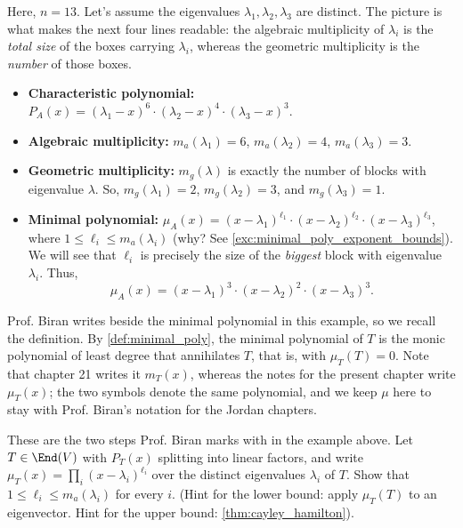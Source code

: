 \begin{example}
Here, $n = 13$. Let's assume the eigenvalues $\lambda_1, \lambda_2, \lambda_3$ are distinct. The picture is what makes the next four lines readable: the algebraic multiplicity of $\lambda_i$ is the \emph{total size} of the boxes carrying $\lambda_i$, whereas the geometric multiplicity is the \emph{number} of those boxes.
\begin{itemize}
    \item \textbf{Characteristic polynomial:} $P_A(x) = (\lambda_1 - x)^6 \cdot (\lambda_2 - x)^4 \cdot (\lambda_3 - x)^3$.
    \item \textbf{Algebraic multiplicity:} $m_a(\lambda_1) = 6$, $m_a(\lambda_2) = 4$, $m_a(\lambda_3) = 3$.
    \item \textbf{Geometric multiplicity:} $m_g(\lambda)$ is exactly the number of blocks with eigenvalue $\lambda$. So, $m_g(\lambda_1) = 2$, $m_g(\lambda_2) = 3$, and $m_g(\lambda_3) = 1$.
    \item \textbf{Minimal polynomial:} $\mu_A(x) = (x - \lambda_1)^{\ell_1} \cdot (x - \lambda_2)^{\ell_2} \cdot (x - \lambda_3)^{\ell_3}$, where $1 \le \ell_i \le m_a(\lambda_i)$ (why? See \cref{exc:minimal_poly_exponent_bounds}). We will see that $\ell_i$ is precisely the size of the \emph{biggest} block with eigenvalue $\lambda_i$. Thus,
    \[
    \mu_A(x) = (x - \lambda_1)^3 \cdot (x - \lambda_2)^2 \cdot (x - \lambda_3)^3.
    \]
\end{itemize}
\end{example}

\begin{remark}
Prof. Biran writes  beside the minimal polynomial in this example, so we recall the definition. By \cref{def:minimal_poly}, the minimal polynomial of $T$ is the monic polynomial of least degree that annihilates $T$, that is, with $\mu_T(T) = 0$. Note that chapter 21 writes it $m_T(x)$, whereas the notes for the present chapter write $\mu_T(x)$; the two symbols denote the same polynomial, and we keep $\mu$ here to stay with Prof. Biran's notation for the Jordan chapters.
\end{remark}

\begin{exercise}
\label{exc:minimal_poly_exponent_bounds}
These are the two steps Prof. Biran marks with  in the example above. Let $T \in \End(V)$ with $P_T(x)$ splitting into linear factors, and write $\mu_T(x) = \prod_i (x - \lambda_i)^{\ell_i}$ over the distinct eigenvalues $\lambda_i$ of $T$. Show that $1 \le \ell_i \le m_a(\lambda_i)$ for every $i$. (Hint for the lower bound: apply $\mu_T(T)$ to an eigenvector. Hint for the upper bound: \cref{thm:cayley_hamilton}).
\end{exercise}


